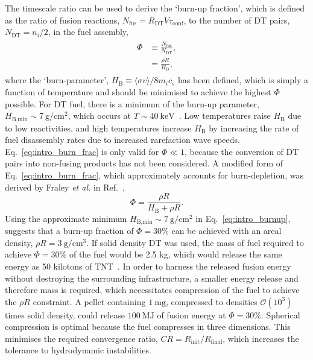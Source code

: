 The timescale ratio can be used to derive the `burn-up fraction', which is defined as the ratio of fusion reactions, $N_{\text{fus}} = R_{\text{DT}}V\tau_{\text{conf}}$, to the number of DT pairs, $N_{\text{DT}}=n_i/2$, in the fuel assembly,
\begin{align}
    \label{eq:intro_burn_frac}
    \begin{split}
        \Phi &\equiv \frac{N_{\text{fus}}}{N_{\text{DT}}},\\
        &= \frac{\rho R}{H_{\text{B}}},
    \end{split}
\end{align}
where the `burn-parameter', $H_{\text{B}} \equiv \langle \sigma v \rangle / 8 m_i c_s$ has been defined, which is simply a function of temperature and should be minimised to achieve the highest $\Phi$ possible.
For DT fuel, there is a minimum of the burn-up parameter, $H_{\text{B,min}}\sim7\ \text{g}/\text{cm}^2$, which occurs at $T\sim40\ \text{keV}$~\cite{atzeni_physics_2004}.
Low temperatures raise $H_{\text{B}}$ due to low reactivities, and high temperatures increase $H_{\text{B}}$ by increasing the rate of fuel disassembly rates due to increased rarefaction wave speeds.
Eq.~\ref{eq:intro_burn_frac} is only valid for $\Phi \ll 1$, because the conversion of DT pairs into non-fusing products has not been considered.
A modified form of Eq.~\ref{eq:intro_burn_frac}, which approximately accounts for burn-depletion, was derived by Fraley \textit{et al.} in Ref.~\cite{fraley_thermonuclear_1974},
\begin{equation}
    \label{eq:intro_burnup}
    \Phi = \frac{\rho R}{H_{\text{B}} + \rho R}.
\end{equation}
Using the approximate minimum $H_{\text{B,min}}\sim7\ \text{g}/\text{cm}^2$ in Eq.~\ref{eq:intro_burnup}, suggests that a burn-up fraction of $\Phi=30\%$ can be achieved with an areal density, $\rho R=3\ \text{g}/\text{cm}^3$.
If solid density DT was used, the mass of fuel required to achieve $\Phi=30\%$ of the fuel would be 2.5 kg, which would release the same energy as 50 kilotons of TNT~\cite{crilly_simulation_2020}.
In order to harness the released fusion energy without destroying the surrounding infrastructure, a smaller energy release and therefore mass is required, which necessitates compression of the fuel to achieve the $\rho R$ constraint.
A pellet containing $1\ \text{mg}$, compressed to densities $\mathcal{O}(10^3)$ times solid density, could release $100\ \text{MJ}$ of fusion energy at $\Phi=30\%$.
Spherical compression is optimal because the fuel compresses in three dimensions.
This minimises the required convergence ratio, $CR = R_{\text{init}}/R_{\text{final}}$, which increases the tolerance to hydrodynamic instabilities.

